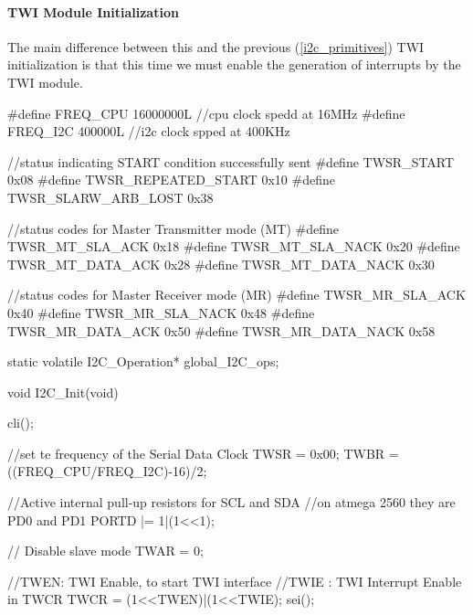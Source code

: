 \paragraph{TWI Module Initialization}
The main difference between this and the previous (\ref{i2c_primitives}) TWI initialization is that this time we must enable the generation of interrupts by the TWI module.
\begin{ccode}
	#define FREQ_CPU 16000000L	//cpu clock spedd at 16MHz
	#define FREQ_I2C 400000L		//i2c clock spped at 400KHz


	//status indicating START condition successfully sent
	#define TWSR_START 0x08
	#define TWSR_REPEATED_START 0x10
	#define TWSR_SLARW_ARB_LOST 0x38

	//status codes for Master Transmitter mode (MT)
	#define TWSR_MT_SLA_ACK 0x18
	#define TWSR_MT_SLA_NACK 0x20
	#define TWSR_MT_DATA_ACK 0x28
	#define TWSR_MT_DATA_NACK 0x30

	//status codes for Master Receiver mode (MR)
	#define TWSR_MR_SLA_ACK 0x40
	#define TWSR_MR_SLA_NACK 0x48
	#define TWSR_MR_DATA_ACK 0x50
	#define TWSR_MR_DATA_NACK 0x58

	static volatile I2C_Operation* global_I2C_ops;

	void I2C_Init(void) {
		cli();
	
		//set te frequency of the Serial Data Clock
		TWSR = 0x00;
		TWBR = ((FREQ_CPU/FREQ_I2C)-16)/2;
	
		//Active internal pull-up resistors for SCL and SDA
			//on atmega 2560 they are PD0 and PD1
		PORTD |= 1|(1<<1);

		// Disable slave mode
		TWAR = 0;
	
		//TWEN: TWI Enable, to start TWI interface
		//TWIE : TWI Interrupt Enable in TWCR
		TWCR = (1<<TWEN)|(1<<TWIE);
		sei();
	}
\end{ccode}

